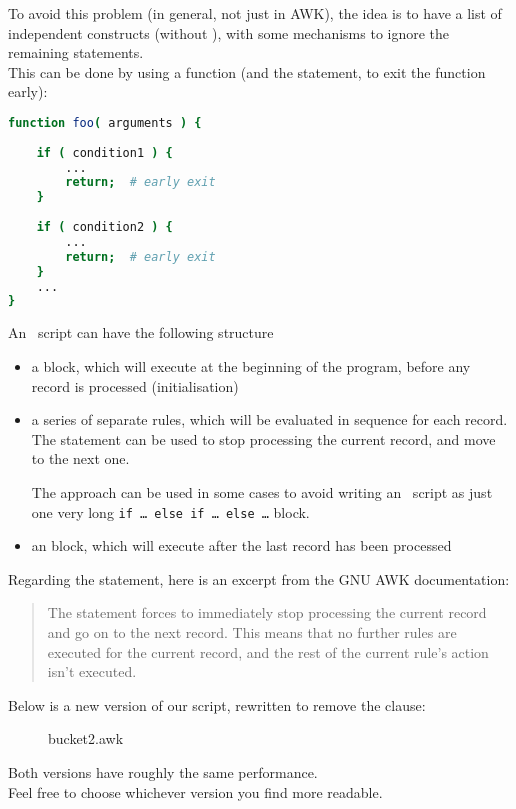 To avoid this problem (in general, not just in AWK), the idea is to have a list of independent  constructs (without ), with some mechanisms to ignore the remaining  statements. \\

This can be done by using a function (and the  statement, to exit the function early):
\begin{lstlisting}[language=sh]
function foo( arguments ) {
	
	if ( condition1 ) {
		...
		return;  # early exit
	}
	
	if ( condition2 ) {
		...
		return;  # early exit
	}
	...
}
\end{lstlisting}

\bigskip


An \awk\ script can have the following structure

\begin{itemize}
	\item a  block, which will execute at the beginning of the program, before any record is processed (initialisation)
	\item a series of separate rules, which will be evaluated in sequence for each record.
	The  statement can be used to stop processing the current record, and move to the next one.
	
	The approach can be used in some cases to avoid writing an \awk\ script as just one very long \texttt{if \dots\ else if \dots\ else \dots} block.
	
	\item an  block, which will execute after the last record has been processed
\end{itemize}



\medskip


Regarding the  statement, here is an excerpt from the GNU AWK documentation:
\begin{quote}
	The  statement forces  to immediately stop processing the current record and go on to the next record. This means that no further rules are executed for the current record, and the rest of the current rule's action isn't executed. \citep{gawk-next}
\end{quote}

\newpage
Below is a new version of our script, rewritten to remove the  clause:

\begin{figure}[h]
	\caption{bucket2.awk}
	
\end{figure}


Both versions have roughly the same performance. \\
Feel free to choose whichever version you find more readable.
